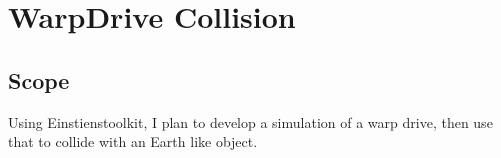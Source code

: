 \chapter{WarpDrive Collision}

\section{Scope}

Using Einstienstoolkit, I plan to develop a simulation of a warp drive, then use that to collide with an Earth like object.
